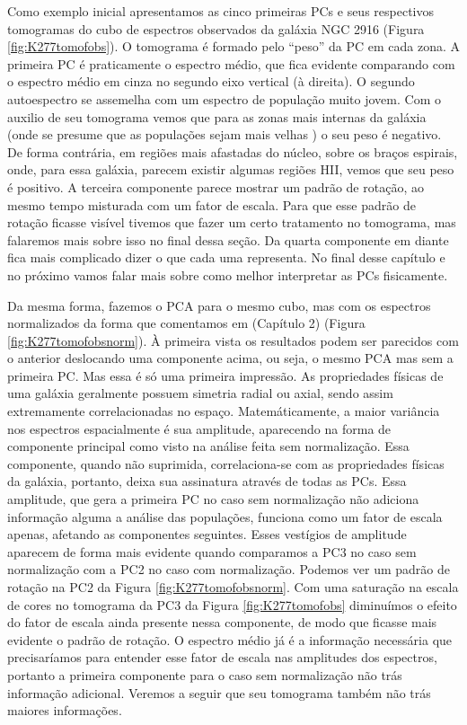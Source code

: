 Como exemplo inicial apresentamos as cinco primeiras PCs e seus respectivos tomogramas do cubo de espectros observados
da galáxia NGC 2916 (Figura \ref{fig:K277tomofobs}). O tomograma é formado pelo ``peso'' da PC em cada zona. A
primeira PC é praticamente o espectro médio, que fica evidente comparando com o espectro médio em cinza no segundo eixo
vertical (à direita). O segundo autoespectro se assemelha com um espectro de população muito jovem. Com o auxilio de seu
tomograma vemos que para as zonas mais internas da galáxia (onde se presume que as populações sejam mais velhas
\citneed) o seu peso é negativo. De forma contrária, em regiões mais afastadas do núcleo, sobre os braços espirais,
onde, para essa galáxia, parecem existir algumas regiões HII, vemos que seu peso é positivo. A terceira componente
parece mostrar um padrão de rotação, ao mesmo tempo misturada com um fator de escala. Para que esse padrão de rotação
ficasse visível tivemos que fazer um certo tratamento no tomograma, mas falaremos mais sobre isso no final dessa seção.
Da quarta componente em diante fica mais complicado dizer o que cada uma representa. No final desse capítulo e no
próximo vamos falar mais sobre como melhor interpretar as PCs fisicamente.

Da mesma forma, fazemos o PCA para o mesmo cubo, mas com os espectros normalizados da forma que comentamos em \fixme
(Capítulo 2) (Figura \ref{fig:K277tomofobsnorm}). À primeira vista os resultados podem ser parecidos com o anterior
deslocando uma componente acima, ou seja, o mesmo PCA mas sem a primeira PC. Mas essa é só uma primeira impressão. As
propriedades físicas de uma galáxia geralmente possuem simetria radial ou axial, sendo assim extremamente
correlacionadas no espaço. Matemáticamente, a maior variância nos espectros espacialmente é sua amplitude, aparecendo na
forma de componente principal como visto na análise feita sem normalização. Essa componente, quando não suprimida,
correlaciona-se com as propriedades físicas da galáxia, portanto, deixa sua assinatura através de todas as PCs. Essa
amplitude, que gera a primeira PC no caso sem normalização não adiciona informação alguma a análise das populações,
funciona como um fator de escala apenas, afetando as componentes seguintes. Esses vestígios de amplitude aparecem de
forma mais evidente quando comparamos a PC3 no caso sem normalização com a PC2 no caso com normalização. Podemos ver um
padrão de rotação na PC2 da Figura \ref{fig:K277tomofobsnorm}. Com uma saturação na escala de cores no tomograma da
PC3 da Figura \ref{fig:K277tomofobs} diminuímos o efeito do fator de escala ainda presente nessa componente, de
modo que ficasse mais evidente o padrão de rotação. O espectro médio já é a informação necessária que precisaríamos para
entender esse fator de escala nas amplitudes dos espectros, portanto a primeira componente para o caso sem normalização
não trás informação adicional. Veremos a seguir que seu tomograma também não trás maiores informações.

